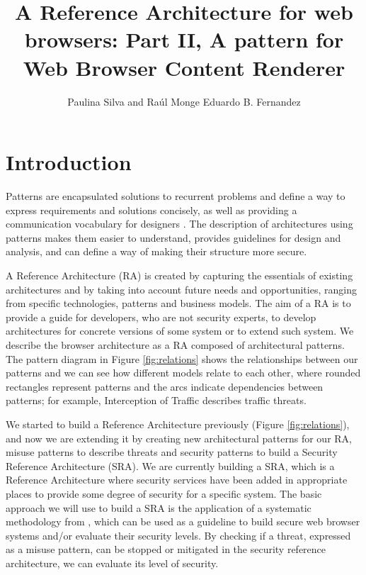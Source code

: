 \documentclass[]{acmlarge}
\title{A Reference Architecture for web browsers: Part II, A pattern for Web Browser Content Renderer}
\author{
Paulina Silva and Raúl Monge
  \affil{Universidad Técnica Federico Santa María}
Eduardo B. Fernandez
  \affil{Florida Atlantic University}
}
\begin{document}

\maketitle

\section{Introduction}
Patterns are encapsulated solutions to recurrent problems and define a way to express requirements and solutions concisely, as well as providing a communication vocabulary for designers \cite{gamma1994design,buschman1996system}. The description of architectures using patterns makes them easier to understand, provides guidelines for design and analysis, and can define a way of making their structure more secure.

 A Reference Architecture (RA) is created by capturing the essentials of existing architectures and by taking into account future needs and opportunities, ranging from specific technologies, patterns and business models. The aim of a RA is to provide a guide for developers, who are not security experts, to develop architectures for concrete versions of some system or to extend such system. We describe the browser architecture as a RA composed  of architectural patterns. The pattern diagram \cite{buschman1996system} in Figure \ref{fig:relations} shows the relationships between our patterns and we can see how different models relate to each other, where rounded rectangles represent patterns and the arcs indicate dependencies between patterns; for example, Interception of Traffic describes traffic threats.

We started to build a Reference Architecture previously (Figure \ref{fig:relations}), and now we are extending it by creating new architectural patterns for our RA, misuse patterns to describe threats and security patterns to build a Security Reference Architecture (SRA). We are currently building a SRA, which is a Reference Architecture where security services have been added in appropriate places to provide some degree of security for a specific system. The basic approach we will use to build a SRA is the application of a systematic methodology from \cite{fernandez2006methodology,Fernandez2011,Fernandez2016}, which can be used as a guideline to build secure web browser systems and/or evaluate their security levels. By checking if a threat, expressed as a misuse pattern, can be stopped or mitigated in the security reference architecture, we can evaluate its level of security.
\end{document}
